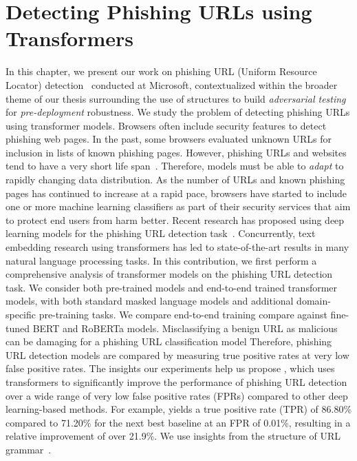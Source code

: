 \chapter{Detecting Phishing URLs using Transformers}
\label{chp:urltran}

In this chapter, we present our work on phishing URL (Uniform Resource Locator) detection~\citep{maneriker2021urltran} conducted at Microsoft, contextualized within the broader theme of our thesis surrounding the use of structures to build \textit{adversarial testing} for \textit{pre-deployment} robustness. 
We study the problem of detecting phishing URLs using transformer models.
Browsers often include security features to detect phishing web pages. 
In the past, some browsers evaluated unknown URLs for inclusion in lists of known phishing pages.
However, phishing URLs and websites tend to have a very short life span~\citep{garera2007framework,chu2013protect}. 
Therefore, models must be able to \textit{adapt} to rapidly changing data distribution.
As the number of URLs and known phishing pages has continued to increase at a rapid pace, browsers have started to include one or more machine learning classifiers as part of their security services that aim to protect end users from harm better.
Recent research has proposed using deep learning models for the phishing URL detection task~\cite{sahoo2017malicious,yerima2020high,ren2019bidirectional,peng2019joint,huang2019phishing,tajaddodianfar2020texception}.
Concurrently, text embedding research using transformers has led to state-of-the-art results in many natural language processing tasks.
In this contribution, we first perform a comprehensive analysis of transformer models on the phishing URL detection task.
We consider both pre-trained models and end-to-end trained transformer models, with both standard masked language models and additional domain-specific pre-training tasks.
We compare end-to-end training compare against fine-tuned BERT and RoBERTa models.
Misclassifying a benign URL as malicious can be damaging for a phishing URL classification model%
Therefore, phishing URL detection models are compared by measuring true positive rates at very low false positive rates.
 The insights our experiments help us propose \URLTranSys, which uses transformers to significantly improve the performance of phishing URL detection over a wide range of very low false positive rates (FPRs) compared to other deep learning-based methods.
For example, \URLTranSys yields a true positive rate (TPR) of 86.80\% compared to 71.20\% for the next best baseline at an FPR of 0.01\%, resulting in a relative improvement of over 21.9\%.
We use insights from the structure of URL grammar~\cite{rfc3986}.

